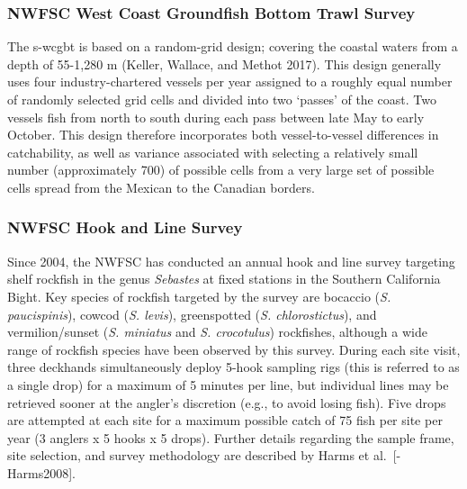 \documentclass[11pt,
  english,
  a4paper,
]{article}
\begin{document}

\hypertarget{nwfsc-west-coast-groundfish-bottom-trawl-survey}{%
\subsubsection{NWFSC West Coast Groundfish Bottom Trawl Survey}\label{nwfsc-west-coast-groundfish-bottom-trawl-survey}}

\leavevmode\tagmcend\tagstructend

The \Gls{s-wcgbt} is based on a random-grid design; covering the coastal waters from a depth of 55-1,280 m {(Keller, Wallace, and Methot 2017)\leavevmode\tagmcend\tagstructend}. This design generally uses four industry-chartered vessels per year assigned to a roughly equal number of randomly selected grid cells and divided into two `passes' of the coast. Two vessels fish from north to south during each pass between late May to early October. This design therefore incorporates both vessel-to-vessel differences in catchability, as well as variance associated with selecting a relatively small number (approximately 700) of possible cells from a very large set of possible cells spread from the Mexican to the Canadian borders.


\hypertarget{nwfsc-hook-and-line-survey}{%
\subsubsection{NWFSC Hook and Line Survey}\label{nwfsc-hook-and-line-survey}}

\leavevmode\tagmcend\tagstructend

Since 2004, the NWFSC has conducted an annual hook and line survey targeting shelf rockfish in the genus \emph{Sebastes} at fixed stations in the Southern California Bight. Key species of rockfish targeted by the survey are bocaccio (\emph{S. paucispinis}), cowcod (\emph{S. levis}), greenspotted (\emph{S. chlorostictus}), and vermilion/sunset (\emph{S. miniatus} and \emph{S. crocotulus}) rockfishes, although a wide range of rockfish species have been observed by this survey. During each site visit, three deckhands simultaneously deploy 5-hook sampling rigs (this is referred to as a single drop) for a maximum of 5 minutes per line, but individual lines may be retrieved sooner at the angler's discretion (e.g., to avoid losing fish). Five drops are attempted at each site for a maximum possible catch of 75 fish per site per year (3 anglers x 5 hooks x 5 drops). Further details regarding the sample frame, site selection, and survey methodology are described by Harms et al.~{[}-Harms2008{]}.
\end{document}
